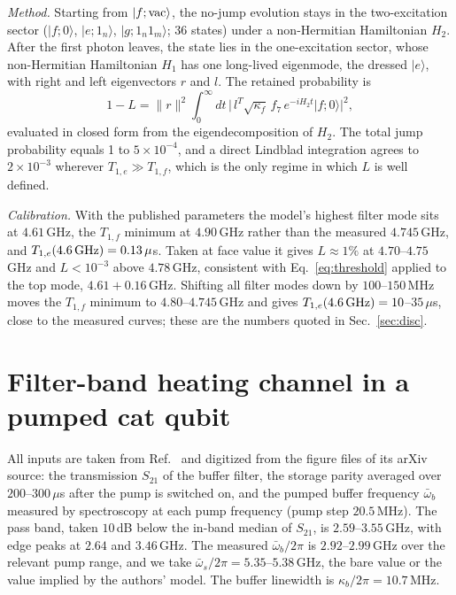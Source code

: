 \documentclass[aps,prresearch,twocolumn,superscriptaddress,nofootinbib,longbibliography,floatfix]{revtex4-2}
\begin{document}
\emph{Method.} Starting from $|f;{\rm vac}\rangle$, the no-jump evolution stays in the two-excitation sector
($|f;0\rangle$, $|e;1_n\rangle$, $|g;1_n1_m\rangle$; 36 states) under a non-Hermitian Hamiltonian $H_2$. After the first
photon leaves, the state lies in the one-excitation sector, whose non-Hermitian Hamiltonian $H_1$ has one long-lived
eigenmode, the dressed $|e\rangle$, with right and left eigenvectors $r$ and $l$. The retained probability is
\begin{equation}
1-L=\|r\|^2\int_0^\infty dt\,\big|\,l^{T}\sqrt{\kappa_f}\,f_7\,e^{-iH_2t}|f;0\rangle\big|^2 ,
\end{equation}
evaluated in closed form from the eigendecomposition of $H_2$. The total jump probability equals 1 to $5\times10^{-4}$,
and a direct Lindblad integration agrees to $2\times10^{-3}$ wherever $T_{1,e}\gg T_{1,f}$, which is the only regime in
which $L$ is well defined.

\emph{Calibration.} With the published parameters the model's highest filter mode sits at $4.61$\,GHz, the $T_{1,f}$
minimum at $4.90$\,GHz rather than the measured $4.745$\,GHz, and $T_{1,e}(4.6\,{\rm GHz})=0.13\,\mu$s. Taken at face
value it gives $L\approx1\%$ at $4.70$--$4.75$\,GHz and $L<10^{-3}$ above $4.78$\,GHz, consistent with
Eq.~\eqref{eq:threshold} applied to the top mode, $4.61+0.16$\,GHz. Shifting all filter modes down by $100$--$150$\,MHz
moves the $T_{1,f}$ minimum to $4.80$--$4.745$\,GHz and gives $T_{1,e}(4.6\,{\rm GHz})=10$--$35\,\mu$s, close to the
measured curves; these are the numbers quoted in Sec.~\ref{sec:disc}. 

\section{Filter-band heating channel in a pumped cat qubit}\label{app:cat}

All inputs are taken from Ref.~\cite{Putterman2025} and digitized from the figure files of its arXiv source: the
transmission $S_{21}$ of the buffer filter, the storage parity averaged over $200$--$300\,\mu$s after the pump is
switched on, and the pumped buffer frequency $\bar\omega_b$ measured by spectroscopy at each pump frequency (pump step
$20.5$\,MHz). The pass band, taken $10$\,dB below the in-band median of $S_{21}$, is $2.59$--$3.55$\,GHz, with edge
peaks at $2.64$ and $3.46$\,GHz. The measured $\bar\omega_b/2\pi$ is $2.92$--$2.99$\,GHz over the relevant pump range,
and we take $\bar\omega_s/2\pi=5.35$--$5.38$\,GHz, the bare value or the value implied by the authors' model. The
buffer linewidth is $\kappa_b/2\pi=10.7$\,MHz.
\end{document}
